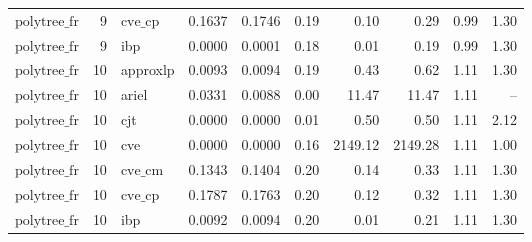 \begin{table}[ht]
\begin{tabular}{lrlrrrrrrr}
$\text{polytree\_fr}$ & 9 & $\text{cve\_cp}$ & 0.1637 & 0.1746 & 0.19 & 0.10 & 0.29 & 0.99 & 1.30 \\
$\text{polytree\_fr}$ & 9 & ibp & 0.0000 & 0.0001 & 0.18 & 0.01 & 0.19 & 0.99 & 1.30 \\
$\text{polytree\_fr}$ & 10 & approxlp & 0.0093 & 0.0094 & 0.19 & 0.43 & 0.62 & 1.11 & 1.30 \\
$\text{polytree\_fr}$ & 10 & ariel & 0.0331 & 0.0088 & 0.00 & 11.47 & 11.47 & 1.11 & -- \\
$\text{polytree\_fr}$ & 10 & cjt & 0.0000 & 0.0000 & 0.01 & 0.50 & 0.50 & 1.11 & 2.12 \\
$\text{polytree\_fr}$ & 10 & cve & 0.0000 & 0.0000 & 0.16 & 2149.12 & 2149.28 & 1.11 & 1.00 \\
$\text{polytree\_fr}$ & 10 & $\text{cve\_cm}$ & 0.1343 & 0.1404 & 0.20 & 0.14 & 0.33 & 1.11 & 1.30 \\
$\text{polytree\_fr}$ & 10 & $\text{cve\_cp}$ & 0.1787 & 0.1763 & 0.20 & 0.12 & 0.32 & 1.11 & 1.30 \\
$\text{polytree\_fr}$ & 10 & ibp & 0.0092 & 0.0094 & 0.20 & 0.01 & 0.21 & 1.11 & 1.30 \\
\bottomrule
\end{tabular}
\end{table}
